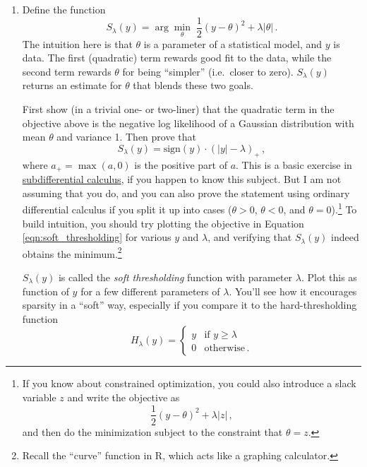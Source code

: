 \documentclass{article}
\begin{document}
\begin{enumerate}[label=(\Alph*)]
\item Define the function
\begin{equation}
\label{eqn:soft_thresholding}
S_\lambda(y) = \arg \min_{\theta} \; \frac{1}{2}(y - \theta)^2 + \lambda | \theta | \, .
\end{equation}
The intuition here is that $\theta$ is a parameter of a statistical model, and $y$ is data.   The first (quadratic) term rewards good fit to the data, while the second term rewards $\theta$ for being ``simpler'' (i.e.~closer to zero).  $S_\lambda(y)$ returns an estimate for $\theta$ that blends these two goals.

First show (in a trivial one- or two-liner) that the quadratic term in the objective above is the negative log likelihood of a Gaussian distribution with mean $\theta$ and variance 1.  Then prove that 
$$
S_\lambda(y) = \mbox{sign}(y) \cdot (|y| - \lambda)_+ \, ,
$$
where $a_+ = \max(a,0)$ is the positive part of $a$.  This is a basic exercise in \href{http://ocw.mit.edu/courses/electrical-engineering-and-computer-science/6-253-convex-analysis-and-optimization-spring-2012/lecture-notes/MIT6_253S12_lec12.pdf}{subdifferential calculus}, if you happen to know this subject.  But I am not assuming that you do, and you can also prove the statement using ordinary differential calculus if you split it up into cases ($\theta>0$, $\theta<0$, and $\theta=0$).\footnote{If you know about constrained optimization, you could also introduce a slack variable $z$ and write the objective as
$$
\frac{1}{2}(y - \theta)^2 + \lambda | z | \, ,
$$
and then do the minimization subject to the constraint that $\theta = z$.}  To build intuition, you should try plotting the objective in Equation \ref{eqn:soft_thresholding} for various $y$ and $\lambda$, and verifying that $S_\lambda(y)$ indeed obtains the minimum.\footnote{Recall the ``curve'' function in R, which acts like a graphing calculator.}

$S_\lambda(y)$ is called the \textit{soft thresholding} function with parameter $\lambda$.  Plot this as function of $y$ for a few different parameters of $\lambda$.  You'll see how it encourages sparsity in a ``soft'' way, especially if you compare it to the hard-thresholding function
$$
H_{\lambda}(y) = 
\left \{
\begin{array}{ll}
y & \mbox{if $y \geq \lambda$} \\
0 & \mbox{otherwise} \, .
\end{array}
\right.
$$



\end{enumerate}
\end{document}
